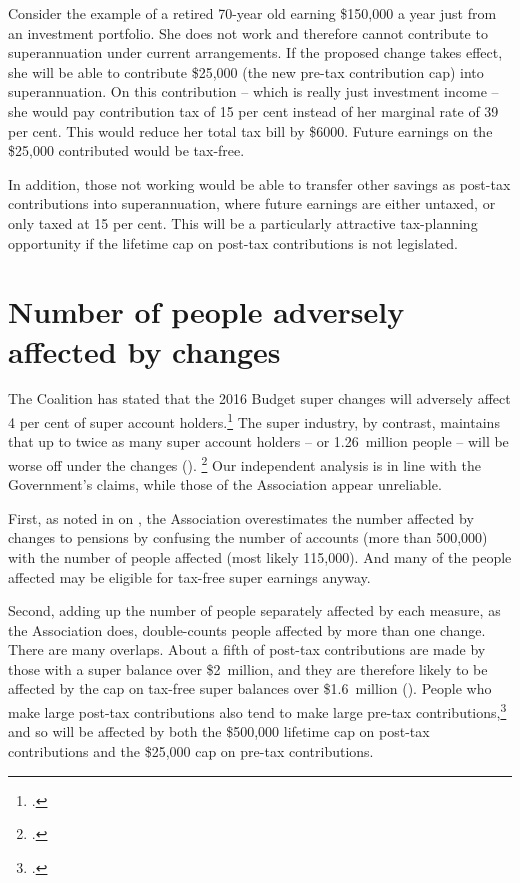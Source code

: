 \documentclass[continuous]{grattan}\usepackage[]{graphicx}\usepackage[]{color}
\begin{document}
Consider the example of a retired 70-year old earning \$150,000 a year just from an investment portfolio. 
She does not work and therefore cannot contribute to superannuation under current arrangements.  
If the proposed change takes effect, she will be able to contribute \$25,000 (the new pre-tax contribution cap) into superannuation. 
On this contribution -- which is really just investment income -- she would pay contribution tax of 15 per cent instead of her marginal rate of 39 per cent. 
This would reduce her total tax bill by \$6000. 
Future earnings on the \$25,000 contributed would be tax-free. 

In addition, those not working would be able to transfer other savings as post-tax contributions into superannuation, where future earnings are either untaxed, or only taxed at 15 per cent. 
This will be a particularly attractive tax-planning opportunity if the lifetime cap on post-tax contributions is not legislated. 

\chapter{{Number of people adversely affected by changes}}\label{chap:how-many-people-will-be-adversely-affected-by-the-super-changes}

The Coalition has stated that the 2016 Budget super changes will adversely affect 4 per cent of super account holders.\footcite{BudgetPapers201617}  
The super industry, by contrast, maintains that up to twice as many super account holders -- or 1.26~million people -- will be worse off under the changes ().%
\footcite{ASFA-2016-Individuals-affected-by-budget-measures}
Our independent analysis is in line with the Government’s claims, while those of the Association appear unreliable. 

First, as noted in  %
on , 
the Association overestimates the number affected by changes to \TTR{} pensions by confusing the number of \TTR{} accounts (more than 500,000) with the number of people affected (most likely 115,000).
And many of the people affected may be eligible for tax-free super earnings anyway. 

Second, adding up the number of people separately affected by each measure, as the Association does, double-counts people affected by more than one change.
There are many overlaps. 
About a fifth of post-tax contributions are made by those with a super balance over \$2~million, and they are therefore likely to be affected by the cap on tax-free super balances over \$1.6~million %
(). %
People who make large post-tax contributions also tend to make large pre-tax contributions,\footcite[][42]{DaleyCoatesWoodEtAl2015Super} and so will be affected by both the \$500,000 lifetime cap on post-tax contributions and the \$25,000 cap on pre-tax contributions. 
\end{document}
